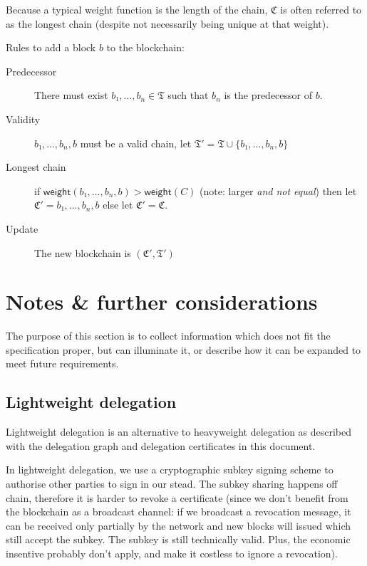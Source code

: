 \documentclass{article}
\newcommand{\weight}[1]{\mathsf{weight}(#1)}
\begin{document}
Because a typical weight function is the length of the chain,
$\mathfrak{C}$ is often referred to as the longest chain (despite not
necessarily being unique at that weight).

Rules to add a block $b$ to the blockchain:

\begin{description}
\item[Predecessor] There must exist $b₁,…,b_n∈ \mathfrak{T}$ such that
  $b_n$ is the predecessor of $b$.
\item[Validity] $b₁,…,b_n,b$ must be a valid chain, let $\mathfrak{T}'
  = \mathfrak{T}∪\{b₁,…,b_n,b\}$
\item[Longest chain] if $\weight{b₁,…,b_n,b} > \weight{C}$ (note:
  larger \emph{and not equal}) then let $\mathfrak{C}'=b₁,…,b_n,b$
  else let $\mathfrak{C}'=\mathfrak{C}$.
\item[Update] The new blockchain is $(\mathfrak{C}', \mathfrak{T}')$
\end{description}

\appendix

\section{Notes \& further considerations}
\label{sec:notes}

The purpose of this section is to collect information which does not
fit the specification proper, but can illuminate it, or describe how
it can be expanded to meet future requirements.

\subsection{Lightweight delegation}
\label{sec:lightweight-delegation}

Lightweight delegation is an alternative to heavyweight delegation as
described with the delegation graph and delegation certificates in
this document.

In lightweight delegation, we use a cryptographic subkey signing
scheme to authorise other parties to sign in our stead. The subkey
sharing happens off chain, therefore it is harder to revoke a
certificate (since we don't benefit from the blockchain as a broadcast
channel: if we broadcast a revocation message, it can be received only
partially by the network and new blocks will issued which still accept
the subkey. The subkey is still technically valid. Plus, the economic
insentive probably don't apply, and make it costless to ignore a
revocation).
\end{document}
